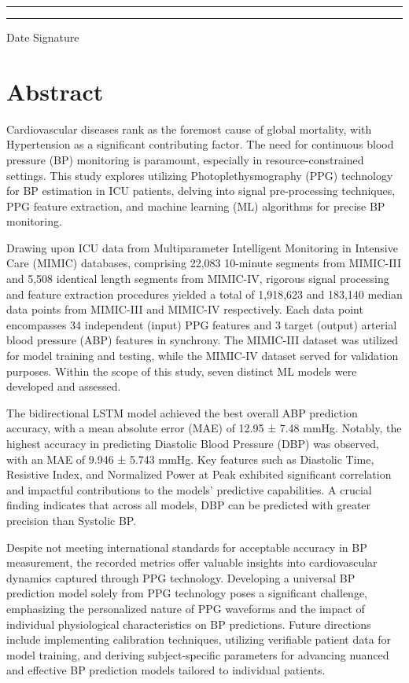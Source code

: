 \documentclass[12pt, bibliography=totoc]{scrartcl}
\begin{document}
    \rule{4cm}{0.5mm} \tab \qquad \qquad \rule{4cm}{0.5mm}

    Date \tab \qquad \qquad Signature

    \newpage
    \doublespacing
    \tableofcontents

    \newpage
    \onehalfspacing


    \section{Abstract}
    \label{sec:abstract}

    Cardiovascular diseases rank as the foremost cause of global mortality, with Hypertension as a significant contributing factor.
    The need for continuous blood pressure (BP) monitoring is paramount, especially in resource-constrained settings.
    This study explores utilizing Photoplethysmography (PPG) technology for BP estimation in ICU patients, delving into signal pre-processing techniques,
    PPG feature extraction, and machine learning (ML) algorithms for precise BP monitoring.

    Drawing upon ICU data from Multiparameter Intelligent Monitoring in Intensive Care (MIMIC) databases, comprising 22,083 10-minute segments from MIMIC-III and 5,508 identical length segments from MIMIC-IV,
    rigorous signal processing and feature extraction procedures yielded a total of 1,918,623 and 183,140 median data points from MIMIC-III and MIMIC-IV respectively.
    Each data point encompasses 34 independent (input) PPG features and 3 target (output) arterial blood pressure (ABP) features in synchrony.
    The MIMIC-III dataset was utilized for model training and testing, while the MIMIC-IV dataset served for validation purposes.
    Within the scope of this study, seven distinct ML models were developed and assessed.

    The bidirectional LSTM model achieved the best overall ABP prediction accuracy, with a mean absolute error (MAE) of 12.95 ± 7.48 mmHg.
    Notably, the highest accuracy in predicting Diastolic Blood Pressure (DBP) was observed, with an MAE of 9.946 ± 5.743 mmHg.
    Key features such as Diastolic Time, Resistive Index, and Normalized Power at Peak exhibited significant correlation and impactful contributions to the models' predictive capabilities.
    A crucial finding indicates that across all models, DBP can be predicted with greater precision than Systolic BP\@.

    Despite not meeting international standards for acceptable accuracy in BP measurement, the recorded metrics offer valuable insights into cardiovascular dynamics captured through PPG technology.
    Developing a universal BP prediction model solely from PPG technology poses a significant challenge, emphasizing the personalized nature of PPG waveforms
    and the impact of individual physiological characteristics on BP predictions.
    Future directions include implementing calibration techniques, utilizing verifiable patient data for model training, and deriving subject-specific parameters
    for advancing nuanced and effective BP prediction models tailored to individual patients.
\end{document}
